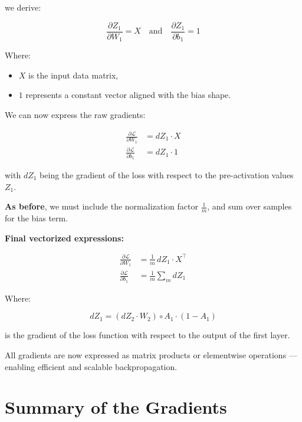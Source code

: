 \documentclass[11pt]{article}
\begin{document}
we derive:

\[
\frac{\partial Z_1}{\partial W_1} = X
\quad \text{and} \quad
\frac{\partial Z_1}{\partial b_1} = 1
\]

Where:
\begin{itemize}
  \item \( X \) is the input data matrix,
  \item \( 1 \) represents a constant vector aligned with the bias shape.
\end{itemize}

We can now express the raw gradients:

\[
\begin{aligned}
\frac{\partial \mathcal{L}}{\partial W_1} &= dZ_1 \cdot X \\
\frac{\partial \mathcal{L}}{\partial b_1} &= dZ_1 \cdot 1
\end{aligned}
\]

with \( dZ_1 \) being the gradient of the loss with respect to the pre-activation values \( Z_1 \).

\textbf{As before}, we must include the normalization factor \( \frac{1}{m} \),  
and sum over samples for the bias term.

\textbf{Final vectorized expressions:}

\begin{resultbox}[title=Layer 1 Gradients]
\[
\begin{aligned}
\frac{\partial \mathcal{L}}{\partial W_1} &= \frac{1}{m} \, dZ_1 \cdot X^\top \\[0.5em]
\frac{\partial \mathcal{L}}{\partial b_1} &= \frac{1}{m} \sum_m dZ_1
\end{aligned}
\]
\end{resultbox}

Where:

\[
dZ_1 = (dZ_2 \cdot W_2) \circ A_1 \cdot (1 - A_1)
\]

is the gradient of the loss function with respect to the output of the first layer.

\begin{insightbox}[title=Key Insight]
All gradients are now expressed as matrix products or elementwise operations  
— enabling efficient and scalable backpropagation.
\end{insightbox}

\section{Summary of the Gradients}
\end{document}
